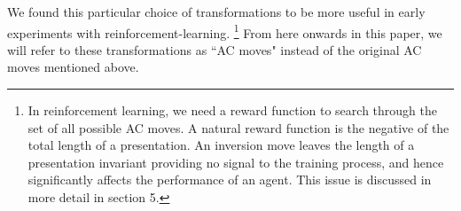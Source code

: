 We found this particular choice of transformations to be more useful in early experiments with reinforcement-learning. 
\footnote{In reinforcement learning, we need a reward function to search through the set of all possible AC moves. A natural reward function is the negative of the total length of a presentation. An inversion move leaves the length of a presentation invariant providing no signal to the training process, and hence significantly affects the performance of an agent. This issue is discussed in more detail in section 5.}
From here onwards in this paper, we will refer to these transformations as ``AC moves" instead of the original AC moves mentioned above.



